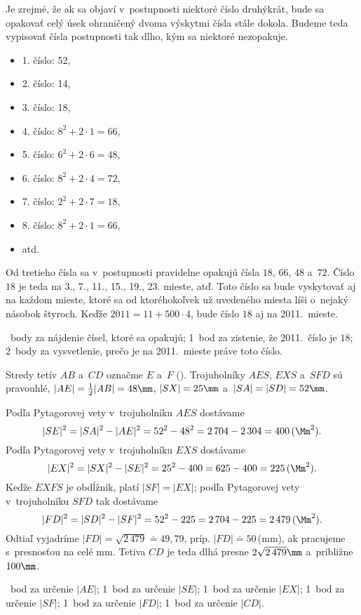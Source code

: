 {%
Je zrejmé, že ak sa objaví v~postupnosti niektoré číslo druhýkrát, bude sa
opakovať celý úsek ohraničený dvoma výskytmi čísla stále dokola.
Budeme teda vypisovať čísla postupnosti tak dlho, kým
sa niektoré nezopakuje.
\begin{itemize}
  \item 1. číslo: 52,
  \item 2. číslo: 14,
  \item 3. číslo: 18,
  \item 4. číslo: $8^2+2\cdot1=66$,
  \item 5. číslo: $6^2+2\cdot6=48$,
  \item 6. číslo: $8^2+2\cdot4=72$,
  \item 7. číslo: $2^2+2\cdot7=18$,
  \item 8. číslo: $8^2+2\cdot1=66$,
  \item atd.
\end{itemize}
Od tretieho čísla sa v~postupnosti pravidelne opakujú čísla $18$, $66$, $48$ a~$72$.
Číslo $18$ je teda na 3., 7., 11., 15., 19., 23. mieste, atď.
Toto číslo sa bude vyskytovať aj na každom mieste, ktoré sa od ktoréhokoľvek
už uvedeného miesta líši o~nejaký násobok štyroch.
Keďže $2011=11+500\cdot4$, bude číslo $18$ aj na 2011.~mieste.

~body za nájdenie čísel, ktoré sa opakujú;
1~bod za zistenie, že 2011.~číslo je $18$;
2~body za vysvetlenie, prečo je na 2011.~mieste práve toto číslo.
\endhodnotenie
}

{%
Stredy tetív $AB$ a~$CD$ označme $E$ a~$F$ (\obr).
Trojuholníky $AES$, $EXS$ a~$SFD$ sú pravouhlé,
$|AE|=\frac12|AB|=48\mm$, $|SX|=25\mm$ a~$|SA|=|SD|=52\mm$.
%

Podľa Pytagorovej vety v~trojuholníku $AES$ dostávame
$$
|SE|^2=|SA|^2-|AE|^2 =52^2-48^2 =2\,704-2\,304 =400\,(\Mm^2).
$$
Podľa Pytagorovej vety v~trojuholníku $EXS$ dostávame
$$
|EX|^2=|SX|^2-|SE|^2 =25^2-400 =625-400 =225\,(\Mm^2).
$$
Keďže $EXFS$ je obdĺžnik, platí $|SF|=|EX|$;
podľa Pytagorovej vety v~trojuholníku $SFD$ tak dostávame
$$
|FD|^2=|SD|^2-|SF|^2 =52^2-225 =2\,704-225 =2\,479\,(\Mm^2).
$$
Odtiaľ vyjadríme $|FD|=\sqrt{2\,479}\doteq 49{,}79$, príp. $|FD|\doteq 50$\,(mm), ak pracujeme s~presnosťou na celé mm.
Tetiva $CD$ je teda dlhá presne $2\sqrt{2\,479}\mm$ a~približne $100\mm$.

~bod za určenie $|AE|$;
1~bod za určenie $|SE|$;
1~bod za určenie $|EX|$;
1~bod za určenie $|SF|$;
1~bod za určenie $|FD|$;
1~bod za určenie $|CD|$.
\endhodnotenie
}

